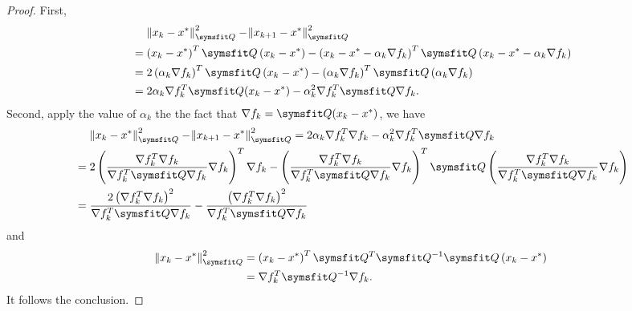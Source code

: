 \documentclass{assignment}[2019/09/15]
\newcommand{\ak}{\alpha_k}
\newcommand{\df}{\nabla f}
\newcommand{\nqs}[1]{\norm{#1}_{\matr{Q}}^2}
\newcommand{\dfdf}{\nabla f_k^T\nabla f_k}
\newcommand{\dfqdf}{\nabla f_k^T\matr{Q}\nabla f_k}
\newcommand{\dfqidf}{\nabla f_k^T\matr{Q}^{-1}\nabla f_k}
\begin{document}
    \begin{proof}
        First,
        \begin{equation}
            \begin{aligned}
                &\phantom{{}={}}\nqs{x_k-x^{*}}-\nqs{x_{k+1}-x^{*}}\\
                &=\left(x_k-x^{*}\right)^T\matr{Q}\left(x_k-x^{*}\right)-\left(x_{k}-x^{*}-\ak\df_k\right)^T\matr{Q}\left(x_{k}-x^{*}-\ak\df_k\right)\\
                &=2\left(\ak\df_k\right)^T\matr{Q}\left(x_{k}-x^{*}\right)-\left(\ak\df_k\right)^T\matr{Q}\left(\ak\df_k\right)\\
                &=2\ak\df_k^T\matr{Q}(x_k-x^*)-\ak^2\df_k^T\matr{Q}\df_k.
            \end{aligned}
        \end{equation}
        Second, apply the value of $\ak$ the the fact that $\df_k=\matr{Q}(x_k-x^*)$, we have
        \begin{equation}
            \begin{aligned}
                &\phantom{{}={}}\nqs{x_k-x^{*}}-\nqs{x_{k+1}-x^{*}}=2\ak\df_k^T\df_k-\ak^2\df_k^T\matr{Q}\df_k\\
                &=2\left(\frac{\dfdf}{\dfqdf}\df_k\right)^T\df_k-\left(\frac{\dfdf}{\dfqdf}\df_k\right)^T\matr{Q}\left(\frac{\dfdf}{\dfqdf}\df_k\right)\\
                &=\frac{2\left(\dfdf\right)^2}{\dfqdf}-\frac{\left(\dfdf\right)^2}{\dfqdf}
            \end{aligned}
        \end{equation}
        and
        \begin{equation}
            \begin{aligned}
                \nqs{x_k-x^*}
                &=\left(x_k-x^{*}\right)^T\matr{Q}^T\matr{Q}^{-1}\matr{Q}\left(x_k-x^{*}\right)\\
                &=\dfqidf.
            \end{aligned}
        \end{equation}
        It follows the conclusion.
    \end{proof}
    
\end{document}
